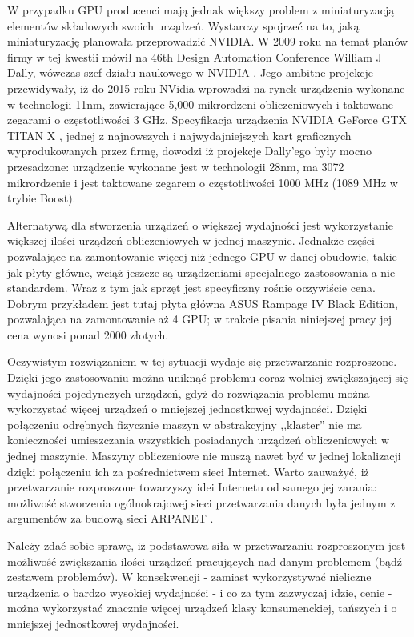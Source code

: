 \documentclass[12pt,a4paper,twoside]{article}
\begin{document}
W przypadku GPU producenci mają jednak większy problem z miniaturyzacją elementów składowych swoich urządzeń. Wystarczy spojrzeć na to, jaką miniaturyzację planowała przeprowadzić NVIDIA. W 2009 roku na temat planów firmy w tej kwestii mówił na 46th Design Automation Conference William J Dally, wówczas szef działu naukowego w NVIDIA \cite{nvidia2009}. Jego ambitne projekcje przewidywały, iż do 2015 roku NVidia wprowadzi na rynek urządzenia wykonane w technologii 11nm, zawierające 5,000 mikrordzeni obliczeniowych i taktowane zegarami o częstotliwości 3 GHz. Specyfikacja urządzenia NVIDIA GeForce GTX TITAN X \cite{nvidia2015}, jednej z najnowszych i najwydajniejszych kart graficznych  wyprodukowanych przez firmę, dowodzi iż projekcje Dally'ego były mocno przesadzone: urządzenie wykonane jest w technologii 28nm, ma 3072 mikrordzenie i jest taktowane zegarem o częstotliwości 1000 MHz (1089 MHz w trybie Boost).

Alternatywą dla stworzenia urządzeń o większej wydajności jest wykorzystanie większej ilości urządzeń obliczeniowych w jednej maszynie. Jednakże części pozwalające na zamontowanie więcej niż jednego GPU w danej obudowie, takie jak płyty główne, wciąż jeszcze są urządzeniami specjalnego zastosowania a nie standardem. Wraz z tym jak sprzęt jest specyficzny rośnie oczywiście cena. Dobrym przykładem jest tutaj płyta główna ASUS Rampage IV Black Edition, pozwalająca na zamontowanie aż 4 GPU; w trakcie pisania niniejszej pracy jej cena wynosi ponad 2000 złotych.

Oczywistym rozwiązaniem w tej sytuacji wydaje się przetwarzanie rozproszone. Dzięki jego zastosowaniu można uniknąć problemu coraz wolniej zwiększającej się wydajności pojedynczych urządzeń, gdyż do rozwiązania problemu można wykorzystać więcej urządzeń o mniejszej jednostkowej wydajności. Dzięki połączeniu odrębnych fizycznie maszyn w abstrakcyjny ,,klaster'' nie ma konieczności umieszczania wszystkich posiadanych urządzeń obliczeniowych w jednej maszynie. Maszyny obliczeniowe nie muszą nawet być w jednej lokalizacji dzięki połączeniu ich za pośrednictwem sieci Internet. Warto zauważyć, iż przetwarzanie rozproszone towarzyszy idei Internetu od samego jej zarania: możliwość stworzenia ogólnokrajowej sieci przetwarzania danych była jednym z argumentów za budową sieci ARPANET \cite{arpanet}.

Należy zdać sobie sprawę, iż podstawowa siła w przetwarzaniu rozproszonym jest możliwość zwiększania ilości urządzeń pracujących nad danym problemem (bądź zestawem problemów). W konsekwencji - zamiast wykorzystywać nieliczne urządzenia o bardzo wysokiej wydajności - i co za tym zazwyczaj idzie, cenie - można wykorzystać znacznie więcej urządzeń klasy konsumenckiej, tańszych i o mniejszej jednostkowej wydajności. 
\end{document}
